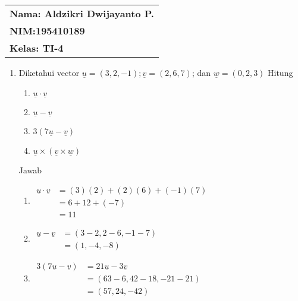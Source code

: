 \documentclass[a4paper,12pt]{article}
\begin{document}
   \null\hfill\begin{tabular}[t]{l@{}}
      \textbf{Nama: Aldzikri Dwijayanto P.} \\
      \textbf{NIM:\@ 195410189} \\
      \textbf{Kelas: TI-4}
   \end{tabular} 

   \begin{enumerate}
      \item Diketahui vector $\underline{u} = (3, 2, -1) ; \underline{v} = (2, 6, 7) $; dan $\underline{w} = (0, 2, 3)$ Hitung 
      \begin{enumerate}[label=\alph*.]
         \item $\underline{u} \cdot \underline{v}$
         \item $\underline{u} - \underline{v}$
         \item $3(7\underline{u} -\underline{v})$
         \item $\underline{u} \times (\underline{v} \times \underline{w})$ \\[4ex]
      \end{enumerate}

      Jawab
      \begin{enumerate}[label= (\alph*)]
         \item 
         $
         \begin{aligned}
            \underline{u} \cdot \underline{v} 
            &= (3)(2) + (2)(6) + (-1)(7) \\
            &= 6 + 12 + (-7) \\
            &= 11
         \end{aligned}
         $\\[2ex]

         \item
         $
         \begin{aligned}
            \underline{u} - \underline{v}
            &= (3 - 2 , 2 - 6 , -1 -7) \\
            &= (1, -4, -8)
         \end{aligned}
         $\\[2ex]

         \item 
         $
         \begin{aligned}
            3(7\underline{u} - \underline{v})
            &= 21\underline{u} - 3\underline{v} \\
            &= (63 - 6 , 42 - 18 , -21 - 21) \\
            &= (57, 24, -42)
         \end{aligned}
         $\\[2ex]


\end{enumerate}
\end{enumerate}
\end{document}
